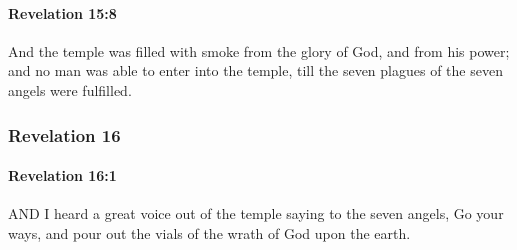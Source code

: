 		\paragraph{Revelation 15:8} %
			\label{REVELATIONNT-15-8}

			And the temple was filled with smoke from the glory of God, and from his power; and no man was able to enter into the temple, till the seven plagues of the seven angels were fulfilled.

			\begin{framed}
			\scriptsize
				\begin{compactdesc}
					\item[SBLG] 
				\end{compactdesc}
			\end{framed}

	\subsubsection{Revelation 16} %
		\label{REVELATIONNT-16}
		
		\paragraph{Revelation 16:1} %
			\label{REVELATIONNT-16-1}

			AND I heard a great voice out of the temple saying to the seven angels, Go your ways, and pour out the vials of the wrath of God upon the earth.

